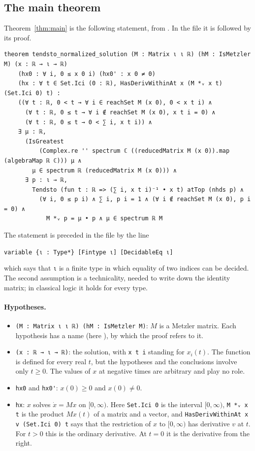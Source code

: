 \documentclass[11pt]{article}
\theoremstyle{definition}
\theoremstyle{remark}
\begin{document}
\subsection{The main theorem}\label{sec:lean:main}

Theorem~\ref{thm:main} is the following statement, from . In the file it is
followed by its proof.
{\footnotesize
\begin{verbatim}
theorem tendsto_normalized_solution (M : Matrix ι ι ℝ) (hM : IsMetzler M) (x : ℝ → ι → ℝ)
    (hx0 : ∀ i, 0 ≤ x 0 i) (hx0' : x 0 ≠ 0)
    (hx : ∀ t ∈ Set.Ici (0 : ℝ), HasDerivWithinAt x (M *ᵥ x t) (Set.Ici 0) t) :
    ((∀ t : ℝ, 0 < t → ∀ i ∈ reachSet M (x 0), 0 < x t i) ∧
      (∀ t : ℝ, 0 ≤ t → ∀ i ∉ reachSet M (x 0), x t i = 0) ∧
      (∀ t : ℝ, 0 ≤ t → 0 < ∑ i, x t i)) ∧
    ∃ μ : ℝ,
      (IsGreatest
          (Complex.re '' spectrum ℂ ((reducedMatrix M (x 0)).map (algebraMap ℝ ℂ))) μ ∧
        μ ∈ spectrum ℝ (reducedMatrix M (x 0))) ∧
      ∃ p : ι → ℝ,
        Tendsto (fun t : ℝ => (∑ i, x t i)⁻¹ • x t) atTop (nhds p) ∧
          (∀ i, 0 ≤ p i) ∧ ∑ i, p i = 1 ∧ (∀ i ∉ reachSet M (x 0), p i = 0) ∧
            M *ᵥ p = μ • p ∧ μ ∈ spectrum ℝ M
\end{verbatim}
}
The statement is preceded in the file by the line
\begin{center}
\verb|variable {ι : Type*} [Fintype ι] [DecidableEq ι]|
\end{center}
which says that \verb|ι| is a finite type in which equality of two indices can be decided. The
second assumption is a technicality, needed to write down the identity matrix; in classical logic
it holds for every type.

\paragraph{Hypotheses.}
\begin{itemize}[leftmargin=2em]
  \item \verb|(M : Matrix ι ι ℝ) (hM : IsMetzler M)|: $M$ is a Metzler matrix. Each hypothesis has
        a name (here ), by which the proof refers to it.
  \item \verb|(x : ℝ → ι → ℝ)|: the solution, with \verb|x t i| standing for $x_i(t)$. The
        function is defined for every real $t$, but the hypotheses and the conclusions involve
        only $t \ge 0$. The values of $x$ at negative times are arbitrary and play no role.
  \item \verb|hx0| and \verb|hx0'|: $x(0) \ge 0$ and $x(0) \ne 0$.
  \item \verb|hx|: $x$ solves $\dot{x} = Mx$ on $[0, \infty)$. Here \verb|Set.Ici 0| is the
        interval $[0, \infty)$, \verb|M *ᵥ x t| is the product $M x(t)$ of a matrix and a vector,
        and \verb|HasDerivWithinAt x v (Set.Ici 0) t| says that the restriction of $x$ to
        $[0, \infty)$ has derivative $v$ at $t$. For $t > 0$ this is the ordinary derivative. At
        $t = 0$ it is the derivative from the right.
\end{itemize}
\end{document}

